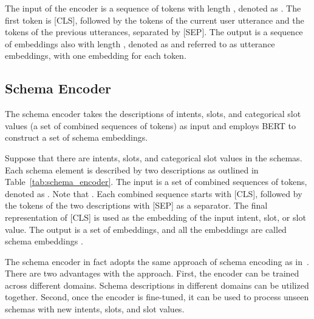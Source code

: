\documentclass[11pt]{article}
\begin{document}
The input of the encoder is a sequence of tokens with length , denoted as . The first token  is [CLS], followed by the tokens of the current user utterance and the tokens of the previous utterances, separated by [SEP]. The output is a sequence of embeddings also with length , denoted as  and referred to as utterance embeddings, with one embedding for each token. 

\subsection{Schema Encoder}
The schema encoder takes the descriptions of intents, slots, and categorical slot values (a set of combined sequences of tokens) as input and employs BERT to construct a set of schema embeddings.

\begin{table}[!h]
\centering
{}
\caption{Descriptions for a dialogue schema. Two combined descriptions are used for describing an intent, a slot, or a value in the schema.} 
\label{tab:schema_encoder}
\end{table}

Suppose that there are  intents,  slots, and  categorical slot values in the schemas. Each schema element is described by two descriptions as outlined in Table~\ref{tab:schema_encoder}. The input is a set of combined sequences of tokens, denoted as . Note that . Each combined sequence starts with [CLS], followed by the tokens of the two descriptions with [SEP] as a separator. The final representation of [CLS] is used as the embedding of the input intent, slot, or slot value. The output is a set of embeddings, and all the embeddings are called schema embeddings . 

The schema encoder in fact adopts the same approach of schema encoding as in~\citep{rastogi2019towards}. There are two advantages with the approach. First, the encoder can be trained across different domains. Schema descriptions in different domains can be utilized together. Second, once the encoder is fine-tuned, it can be used to process unseen schemas with new intents, slots, and slot values.
\end{document}
